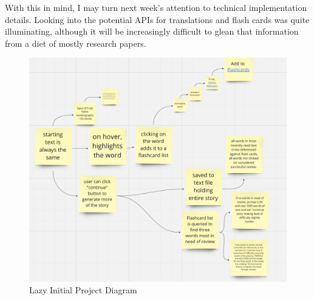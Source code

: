 \documentclass[
	letterpaper, %
]{jdf}
\begin{document}
With this in mind, I may turn next week's attention to technical implementation details. Looking into the potential APIs for translations and flash cards was quite illuminating, although it will be increasingly difficult to glean that information from a diet of mostly research papers.

\begin{figure}
    \centering
    \includegraphics[width=0.5\linewidth]{Assignments//Assignment 2/design_sketch.png}
    \caption{Lazy Initial Project Diagram}
    \label{fig:enter-label}
\end{figure}

\printbibliography{}
\end{document}

